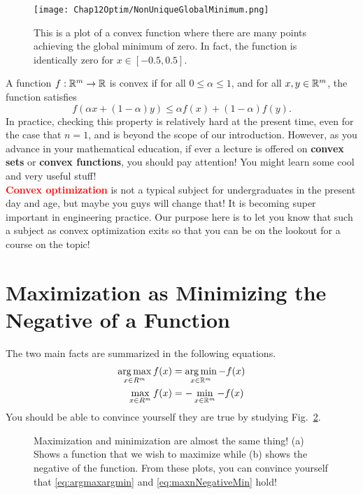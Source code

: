 \begin{figure}[thb]%
\centering
\texttt{[image: Chap12Optim/NonUniqueGlobalMinimum.png]}%
\caption[]{This is a plot of a convex function where there are many points achieving the global minimum of zero. In fact, the function is identically zero for $x\in [-0.5, 0.5]$.
}    
\label{fig:nonuniqueArgMin}
\end{figure}

\begin{tcolorbox}[title=\textbf{Convex Functions}]
A function $f:\mathbb R^m \to \mathbb R$ is convex if for all $0 \le \alpha \le 1$, and for all $x, y \in \mathbb R^m$, the function satisfies
\begin{equation}
  \label{eq:ConvexFunctionDefinedR}  
    f(\alpha x + (1-\alpha) y) \le \alpha f(x) + (1 -\alpha) f(y).
\end{equation}
In practice, checking this property is relatively hard at the present time, even for the case that $n=1$, and is beyond the scope of our introduction. However, as you advance in your mathematical education, if ever a lecture is offered on \textbf{convex sets} or \textbf{convex functions}, you should pay attention! You might learn some cool and very useful stuff! \\

\textcolor{red}{\textbf{Convex optimization}} is not a typical subject for undergraduates in the present day and age, but maybe you guys will change that! It is becoming super important in engineering practice. Our purpose here is to let you know that such a subject as convex optimization exits so that you can be on the lookout for a course on the topic!
\end{tcolorbox}

\section{Maximization as Minimizing the Negative of a Function}
The two main facts are summarized in the following equations. 
\begin{align}
\label{eq:argmaxargmin}
\operatorname*{arg\,max}_{x\in R^m} f(x) &= \operatorname*{arg\,min}_{x\in \mathbb R^m} -f(x) \\
\label{eq:maxnNegativeMin}
\max_{x\in R^m} f(x) &=- \min_{x\in \mathbb R^m} -f(x)
\end{align}
You should be able to convince yourself they are true by studying Fig.~\ref{fig:MaxMinWhoCares}.


\begin{figure}[bht]%
\centering
{}%
\hspace{5pt}%
%
\caption[]{Maximization and minimization are almost the same thing!  (a) Shows a function that we wish to maximize while (b) shows the negative of the function. From these plots, you can convince yourself that \eqref{eq:argmaxargmin} and \eqref{eq:maxnNegativeMin} hold!}
    \label{fig:MaxMinWhoCares}%
\end{figure}


